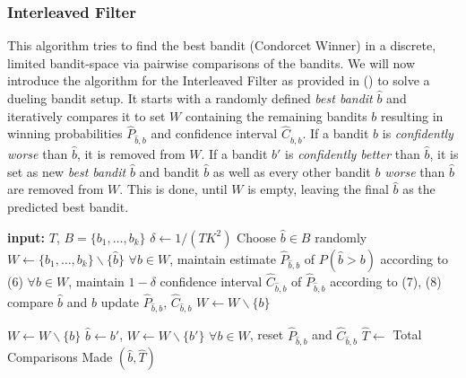 \documentclass[
  letterpaper,
  DIV=11,
  numbers=noendperiod,
  oneside]{scrreprt}
\theoremstyle{remark}
\begin{document}
\subsubsection{Interleaved Filter}\label{interleaved-filter}

This algorithm tries to find the best bandit (Condorcet Winner) in a
discrete, limited bandit-space via pairwise comparisons of the bandits.
We will now introduce the algorithm for the Interleaved Filter as
provided in () to solve a
dueling bandit setup. It starts with a randomly defined \emph{best
bandit} \(\hat{b}\) and iteratively compares it to set \(W\) containing
the remaining bandits \(b\) resulting in winning probabilities
\(\hat{P}_{\hat{b},b}\) and confidence interval \(\hat{C}_{\hat{b},b}\).
If a bandit \(b\) is \emph{confidently worse} than \(\hat{b}\), it is
removed from \(W\). If a bandit \(b'\) is \emph{confidently better} than
\(\hat{b}\), it is set as new \emph{best bandit} \(\hat{b}\) and bandit
\(\hat{b}\) as well as every other bandit \(b\) \emph{worse} than
\(\hat{b}\) are removed from \(W\). This is done, until \(W\) is empty,
leaving the final \(\hat{b}\) as the predicted best bandit.

\textbf{input:} \(T\), \(B=\{b_1, \dots, b_k\}\)
\(\delta \gets 1/(TK^2)\) Choose \(\hat{b} \in B\) randomly
\(W \gets \{b_1, \dots, b_k\} \backslash \{\hat{b}\}\)
\(\forall b \in W\), maintain estimate \(\hat{P}_{\hat{b},b}\) of
\(P(\hat{b} > b)\) according to (6) \(\forall b \in W\), maintain
\(1 - \delta\) confidence interval \(\hat{C}_{\hat{b},b}\) of
\(\hat{P}_{\hat{b},b}\) according to (7), (8) compare \(\hat{b}\) and
\(b\) update \(\hat{P}_{\hat{b},b}\), \(\hat{C}_{\hat{b},b}\)
\(W \gets W \backslash \{b\}\)

\(W \gets W \backslash \{b\}\) \(\hat{b} \gets b'\),
\(W \gets W \backslash \{b'\}\) \(\forall b \in W\), reset
\(\hat{P}_{\hat{b},b}\) and \(\hat{C}_{\hat{b},b}\) \(\hat{T} \gets\)
Total Comparisons Made \((\hat{b}, \hat{T})\)
\end{document}
